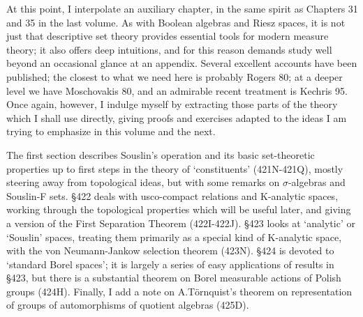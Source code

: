
\def\chaptername{Descriptive set theory}
\def\sectionname{Introduction}


At this point, I interpolate an auxiliary chapter, in the same spirit as
Chapters 31 and 35 in the last volume.   As with Boolean algebras and
Riesz spaces, it is not just that descriptive set theory provides
essential tools for modern measure theory;  it also offers deep
intuitions, and for this reason demands study well beyond an occasional
glance at an appendix.   Several excellent accounts have been published;
the closest to what we need here is probably {\smc Rogers 80}; at a
deeper level we have {\smc Moschovakis 80}, and an admirable recent
treatment is {\smc Kechris 95}.   Once again, however, I indulge myself
by extracting those parts of the theory which I shall use directly,
giving proofs and exercises adapted to the ideas I am trying to
emphasize in this volume and the next.

The first section describes Souslin's operation and its basic
set-theoretic properties up to first steps in the theory of `constituents'
(421N-421Q), %
mostly steering away from topological ideas,
but with some remarks on $\sigma$-algebras and Souslin-F sets.   \S422
deals with usco-compact relations and K-analytic spaces, working through
the topological properties which will be useful later, and giving a
version of the First Separation Theorem (422I-422J).   \S423 looks at
`analytic' or `Souslin' spaces, treating them primarily as a special
kind of K-analytic space, with the von Neumann-Jankow selection theorem
(423N).   \S424 is devoted to `standard Borel spaces';  it is largely a
series of easy applications of results in \S423, but there is a
substantial theorem on Borel measurable actions of Polish groups (424H).
Finally, I add a note on A.T\"ornquist's theorem on representation of
groups of automorphisms of quotient algebras (425D).

\discrpage


